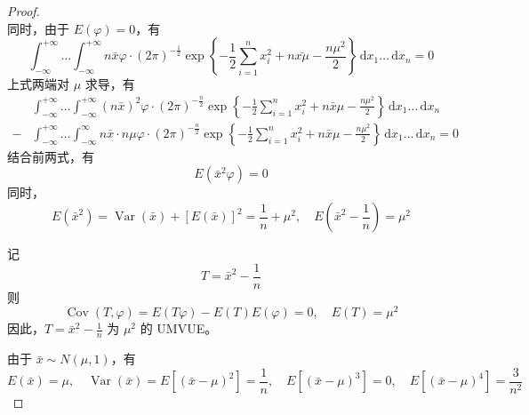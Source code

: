 \documentclass[normal,founder,mtpro2,cn]{elegantnote}
\begin{document}
\begin{enumerate}
\begin{proof}
\begin{equation*}
            \end{equation*}
            同时，由于 $E\left(\varphi\right)=0$，有
            \begin{equation*}
                \int_{-\infty}^{+\infty}\ldots\int_{-\infty}^{+\infty}n\bar{x}\varphi\cdot(2\pi)^{-\frac{1}{2}}\exp\left\{-\frac{1}{2}\sum_{i=1}^{n}x_{i}^{2}+n\bar{x\mu}-\frac{n\mu^{2}}{2}\right\}\,\mathrm{d}x_{1}\ldots\,\mathrm{d}x_{n}=0
            \end{equation*}
            上式两端对 $\mu$ 求导，有
            \begin{equation*}
                \begin{aligned}
                      & \int_{-\infty}^{+\infty}\ldots\int_{-\infty}^{+\infty}\left(n\bar{x}\right)^{2}\varphi\cdot(2\pi)^{-\frac{n}{2}}\exp\left\{-\frac{1}{2}\sum_{i=1}^{n}x_{i}^{2}+n\bar{x}\mu-\frac{n\mu^{2}}{2}\right\}\,\mathrm{d}x_{1}\ldots\,\mathrm{d}x_{n} \\
                    - & \int_{-\infty}^{+\infty}\ldots\int_{-\infty}^{\infty}n\bar{x}\cdot n\mu\varphi\cdot(2\pi)^{-\frac{n}{2}}\exp\left\{-\frac{1}{2}\sum_{i=1}^{n}x_{i}^{2}+n\bar{x} \mu-\frac{n\mu^{2}}{2}\right\}\,\mathrm{d}x_{1}\ldots\,\mathrm{d}x_{n}=0
                \end{aligned}
            \end{equation*}
            结合前两式，有
            \begin{equation*}
                E\left(\bar{x}^{2}\varphi\right)=0
            \end{equation*}
            同时，
            \begin{equation*}
                E\left(\bar{x}^{2}\right)=\operatorname{Var}\left(\bar{x}\right)+\left[E\left(\bar{x}\right)\right]^{2}=\frac{1}{n}+\mu^{2},\quad E\left(\bar{x}^{2}-\frac{1}{n}\right)=\mu^{2}
            \end{equation*}

            记
            \begin{equation*}
                T=\bar{x}^{2}-\frac{1}{n}
            \end{equation*}
            则
            \begin{equation*}
                \operatorname{Cov}\left(T,\varphi\right)=E\left(T\varphi\right)-E\left(T\right)E\left(\varphi\right)=0,\quad E\left(T\right)=\mu^{2}
            \end{equation*}
            因此，$T=\bar{x}^{2}-\frac{1}{n}$ 为 $\mu^{2}$ 的 UMVUE。

            由于 $\bar{x}\sim N\left(\mu,1\right)$，有
            \begin{equation*}
                E(\bar{x})=\mu,\quad\operatorname{Var}(\bar{x})=E\left[\left(\bar{x}-\mu\right)^{2}\right]=\frac{1}{n},\quad E\left[\left(\bar{x}-\mu\right)^{3}\right]=0,\quad E\left[\left(\bar{x}-\mu\right)^{4}\right]=\frac{3}{n^{2}}
            \end{equation*}


\end{proof}
\end{enumerate}
\end{document}

